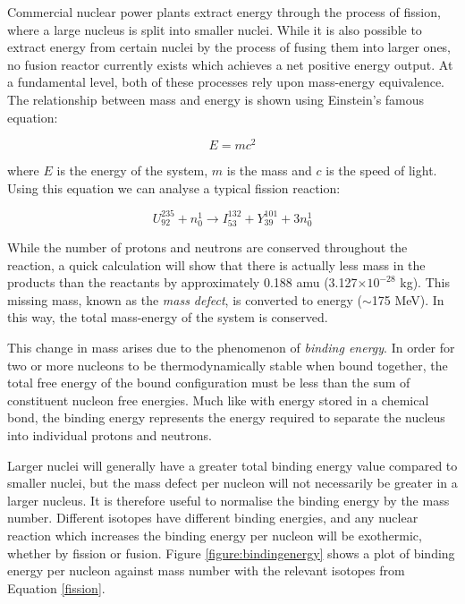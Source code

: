 Commercial nuclear power plants extract energy through the process of fission, where a large nucleus is split into smaller nuclei. While it is also possible to extract energy from certain nuclei by the process of fusing them into larger ones, no fusion reactor currently exists which achieves a net positive energy output. At a fundamental level, both of these processes rely upon mass-energy equivalence. The relationship between mass and energy is shown using Einstein's famous equation:

\begin{equation}
\label{emc2}
    E = mc^{2}
\end{equation}

where $E$ is the energy of the system, $m$ is the mass and $c$ is the speed of light. Using this equation we can analyse a typical fission reaction:

\begin{equation}
\label{fission}
    U^{235}_{92} + n^{1}_{0} \longrightarrow I^{132}_{53} + Y^{101}_{39} + 3n^{1}_{0} 
\end{equation}

While the number of protons and neutrons are conserved throughout the reaction, a quick calculation will show that there is actually less mass in the products than the reactants by approximately 0.188 amu (3.127$\times 10^{-28}$ kg). This missing mass, known as the \emph{mass defect}, is converted to energy ($\sim$175 MeV). In this way, the total mass-energy of the system is conserved. 

This change in mass arises due to the phenomenon of \emph{binding energy}. In order for two or more nucleons to be thermodynamically stable when bound together, the total free energy of the bound configuration must be less than the sum of constituent nucleon free energies. Much like with energy stored in a chemical bond, the binding energy represents the energy required to separate the nucleus into individual protons and neutrons. 

Larger nuclei will generally have a greater total binding energy value compared to smaller nuclei, but the mass defect per nucleon will not necessarily be greater in a larger nucleus. It is therefore useful to normalise the binding energy by the mass number. Different isotopes have different binding energies, and any nuclear reaction which increases the binding energy per nucleon will be exothermic, whether by fission or fusion. Figure \ref{figure:bindingenergy} shows a plot of binding energy per nucleon against mass number with the relevant isotopes from Equation \ref{fission}. 

